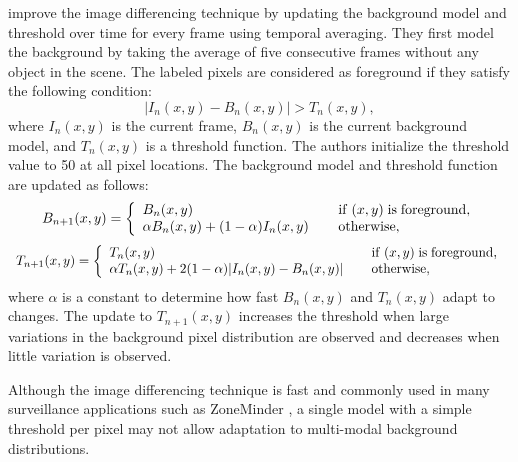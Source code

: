  improve the image differencing 
technique by updating the background model and threshold over time for
every frame using temporal averaging. They first model the background
by taking the average of five consecutive frames without any object in
the scene. The labeled pixels are considered as foreground if they
satisfy the following condition:
\[
  |{I_n (x,y) - B_n (x,y)}| > T_n (x,y),
\]
where $I_n (x,y)$ is the current frame, $B_n (x,y)$ is the current
background model, and $T_n (x,y)$ is a threshold function. The authors
initialize the threshold value to 50 at all pixel locations. The
background model and threshold function are updated as follows:
\[
  \begin{array}{ll}
    B_{n + 1} (x,y) = \left\{ 
    \begin{array}{l}
      B_n (x,y) \\ 
      \alpha B_n (x,y) + (1 - \alpha )I_n (x,y) 
    \end{array} \right.
    &
    \begin{array}{l}
      {\rm if}\;(x,y)\;{\rm is}\;{\rm foreground}, \hfill  \\
      {\rm otherwise}, \hfill 
    \end{array}
  \end{array}
\]
\[
  \begin{array}{ll}
    T_{n + 1} (x,y) = \left\{
    \begin{array}{l}
      T_n (x,y) \\ 
      \alpha T_n (x,y) + 2(1 - \alpha)| {I_n (x,y) - B_n (x,y)}|
    \end{array} \right.
    &
    \begin{array}{l}
      {\rm if}\;(x,y)\;{\rm is}\;{\rm foreground}, \hfill  \\
      {\rm otherwise}, \hfill 
    \end{array}
  \end{array}
\]
where $\alpha$ is a constant to determine how fast $B_n (x,y)$ and
$T_n (x,y)$ adapt to changes. The update to $T_{n+1}(x, y)$ increases
the threshold when large variations in the background pixel
distribution are observed and decreases when little variation is
observed.

Although the image differencing technique is fast and commonly used in
many surveillance applications such as
ZoneMinder , a single model with a simple
threshold per pixel may not allow adaptation to multi-modal background
distributions.

